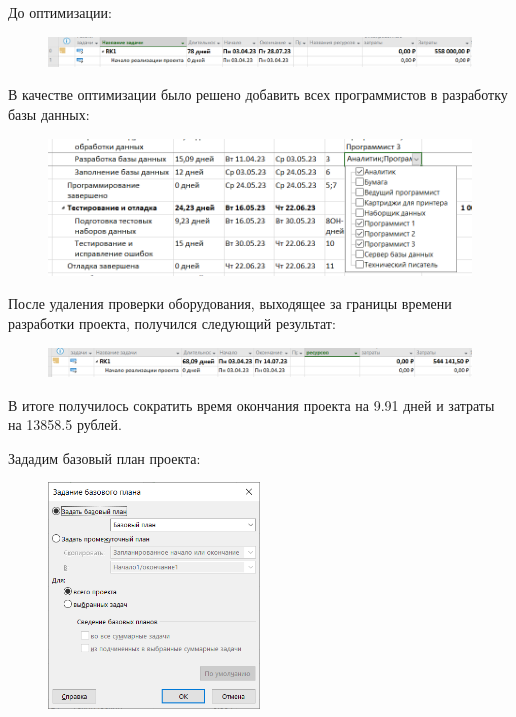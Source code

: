 До оптимизации:

\begin{figure}[H]
	\begin{center}
		\includegraphics[width=\textwidth]{imgs/task_9_1.png}
	\end{center}
\end{figure}

В качестве оптимизации было решено добавить всех программистов в разработку базы данных:

\begin{figure}[H]
	\begin{center}
		\includegraphics[width=\textwidth]{imgs/task_9_2.png}
	\end{center}
\end{figure}

После удаления проверки оборудования, выходящее за границы времени разработки проекта, получился следующий результат:

\begin{figure}[H]
	\begin{center}
		\includegraphics[width=\textwidth]{imgs/task_9_3.png}
	\end{center}
\end{figure}

В итоге получилось сократить время окончания проекта на 9.91 дней и затраты на 13858.5 рублей.

Зададим базовый план проекта:

\begin{figure}[H]
	\begin{center}
		\includegraphics[width=0.5\textwidth]{imgs/task_9_4.png}
	\end{center}
\end{figure}

